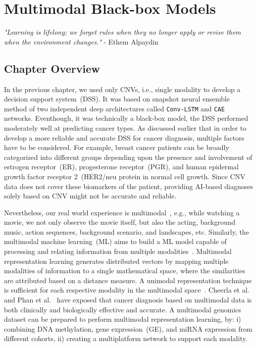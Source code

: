 \chapter{Multimodal Black-box Models}
\label{chapter:multiodality}

\textit{"Learning is lifelong; we forget rules when they no longer apply or revise them when the environment changes."} - Ethem Alpaydin 

\section{Chapter Overview}
In the previous chapter, we used only CNVs, i.e., single modality to develop a decision support system~(DSS). It was based on snapshot neural ensemble method of two independent deep architectures called \texttt{Conv-LSTM} and \texttt{CAE} networks. Eventhough, it was technically a black-box model, the DSS performed moderately well at predicting cancer types. As discussed earlier that in order to develop a more reliable and accurate DSS for cancer diagnosis, multiple factors have to be considered. For example, breast cancer patients can be broadly categorized into different groups depending upon the presence and involvement of estrogen receptor~(ER), progesterone receptor~(PGR), and human epidermal growth factor receptor 2~(HER2/neu protein in normal cell growth. Since CNV data does not cover these biomarkers of the patient, providing AI-based diagnoses solely based on CNV might not be accurate and reliable. 

\hspace*{3.5mm} Nevertheless, our real world experience is multimodal~\cite{mmsurvey}, e.g., while watching a movie, we not only observe the movie itself, but also the acting, background music, action sequences, background scenario, and landscapes, etc. Similarly, the multimodal machine learning~(ML) aims to build a ML model capable of processing and relating information from multiple modalities~\cite{mmsurvey}. Multimodal representation learning generates distributed vectors by mapping multiple modalities of information to a single mathematical space, where the similarities are attributed based on a distance measure. A unimodal representation technique is sufficient for each respective modality in the multimodal space~\cite{ito2018effects}. Cheerla et al.~\cite{cheerla2019deep} and Phan et al.~\cite{phan2016integration} have exposed that cancer diagnosis based on multimodal data is both clinically and biologically effective and accurate. A multimodal genomics dataset can be prepared to perform multimodal representation learning, by: i) combining DNA methylation, gene expression~(GE), and miRNA expression from different cohorts, ii) creating a multiplatform network to support each modality. 

